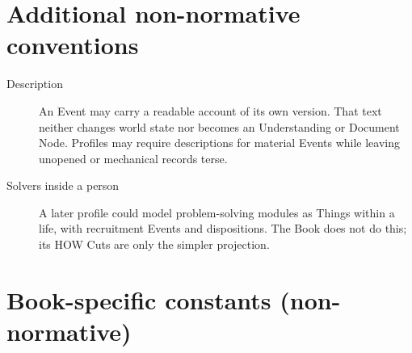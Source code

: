 \documentclass[11pt,a4paper]{article}
\begin{document}
\section{Additional non-normative conventions}

\begin{description}
  \item[Description] An Event may carry a readable account of its own version.
    That text neither changes world state nor becomes an Understanding or
    Document Node. Profiles may require descriptions for material Events while
    leaving unopened or mechanical records terse.
  \item[Solvers inside a person] A later profile could model problem-solving
    modules as Things within a life, with recruitment Events and dispositions.
    The Book does not do this; its HOW Cuts are only the simpler projection.
\end{description}

\section{Book-specific constants (non-normative)}
\end{document}
